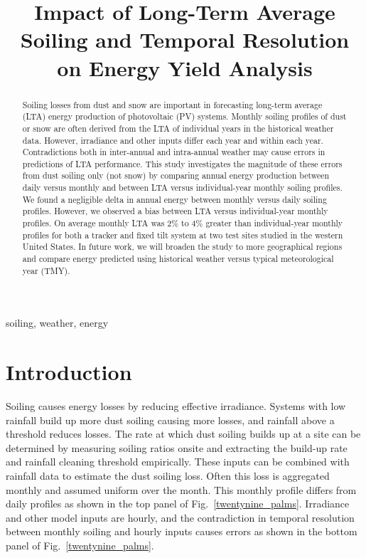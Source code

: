 \documentclass[conference]{IEEEtran}
\begin{document}
\title{Impact of Long-Term Average Soiling and Temporal Resolution on Energy Yield Analysis}

\author{
	}

\maketitle

\begin{abstract}
Soiling losses from dust and snow are important in forecasting long-term average (LTA) energy production of photovoltaic (PV) systems. Monthly soiling profiles of dust or snow are often derived from the LTA of individual years in the historical weather data. However, irradiance and other inputs differ each year and within each year. Contradictions both in inter-annual and intra-annual weather may cause errors in predictions of LTA performance. This study investigates the magnitude of these errors from dust soiling only (not snow) by comparing annual energy production between daily versus monthly and between LTA versus individual-year monthly soiling profiles. We found a negligible delta in annual energy between monthly versus daily soiling profiles. However, we observed a bias between LTA versus individual-year monthly profiles. On average monthly LTA was 2\% to 4\% greater than individual-year monthly profiles for both a tracker and fixed tilt system at two test sites studied in the western United States. In future work, we will broaden the study to more geographical regions and compare energy predicted using historical weather versus typical meteorological year (TMY).
\end{abstract}

\begin{IEEEkeywords}
soiling, weather, energy
\end{IEEEkeywords}

\section{Introduction}
Soiling causes energy losses by reducing effective irradiance. Systems with low rainfall build up more dust soiling causing more losses, and rainfall above a threshold reduces losses. The rate at which dust soiling builds up at a site can be determined by measuring soiling ratios onsite and extracting the build-up rate and rainfall cleaning threshold empirically. These inputs can be combined with rainfall data to estimate the dust soiling loss. Often this loss is aggregated monthly and assumed uniform over the month. This monthly profile differs from daily profiles as shown in the top panel of Fig.~\ref{twentynine_palms}. Irradiance and other model inputs are hourly, and the contradiction in temporal resolution between monthly soiling and hourly inputs causes errors as shown in the bottom panel of Fig.~\ref{twentynine_palms}.
\end{document}
